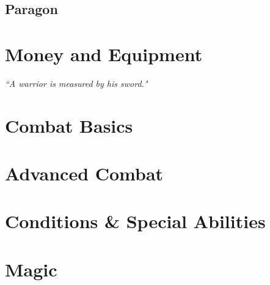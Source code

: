 \documentclass[10pt]{report}
\newcommand{\quot}[1]{\emph{#1}\medskip}
\begin{document}
\section{Paragon}






\chapter{Money and Equipment}
\vspace*{-36pt}
\begin{flushright}\quot{``A warrior is measured by his sword."} \end{flushright}






\chapter{Combat Basics}




\chapter{Advanced Combat}








\chapter{Conditions \& Special Abilities}






%
%
%
%
%


\chapter{Magic}
\end{document}
